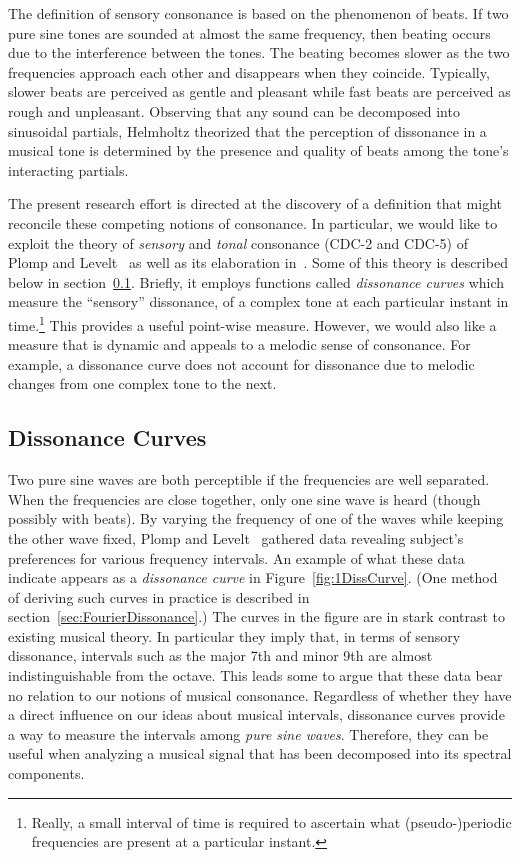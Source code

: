 The definition of sensory consonance is based on the  phenomenon of
beats.  If two pure sine tones are sounded at almost the same
frequency, then beating occurs due to the interference between the
tones.  The beating becomes slower as the two frequencies approach
each other and disappears when they coincide.  Typically, slower  
beats are perceived as gentle and pleasant while fast beats are
perceived as rough and unpleasant. Observing that any sound can be
decomposed into sinusoidal partials, Helmholtz \cite{Helmholtz:1877}
theorized that the perception of dissonance in a musical tone is
determined by the presence and quality of beats among the tone's
interacting partials. 

The present research effort is directed at the discovery of a
definition that might reconcile these competing notions of consonance.
In particular, we  would like to exploit the theory of \emph{sensory}
and \emph{tonal} consonance (CDC-2 and CDC-5)
of Plomp and Levelt~\cite{Plomp:1965} as well as its elaboration
in~\cite{Sethares:1997}.  Some of this theory is described below in
section~\ref{sec:disscurves}.  Briefly, it employs functions called
\emph{dissonance curves} which measure the ``sensory'' dissonance, of
a complex tone at each particular instant in time.\footnote{Really, a
small interval of time is required to ascertain what (pseudo-)periodic
frequencies are present at a particular instant.}   
This provides a useful point-wise measure.
However, we would also like a measure that is dynamic and appeals to a
melodic sense of consonance.  For example, a dissonance curve does not
account for dissonance due to melodic changes from one complex tone to
the next.  

\subsection{Dissonance Curves}
\label{sec:disscurves}
Two pure sine waves are both perceptible if the frequencies are well
separated.  When the frequencies are close together, only one sine
wave is heard (though possibly with beats).  By varying the frequency
of one of the waves while keeping the other wave fixed, Plomp and
Levelt~\cite{Plomp:1965} gathered data revealing subject's preferences
for various frequency intervals.  An example of what these data
indicate appears as a \emph{dissonance curve} in 
Figure~\ref{fig:1DissCurve}.  (One method of deriving such curves in
practice is described in section~\ref{sec:FourierDissonance}.)  The
curves in the figure are in stark contrast to existing musical theory.
In particular they imply that, in terms of sensory dissonance,
intervals such as the major 7th and minor 9th are almost
indistinguishable from the octave.  This leads some to argue that
these data bear no relation to our notions of musical
consonance. Regardless of whether they have a direct influence on our
ideas about musical intervals, dissonance curves provide a way to
measure the intervals among \emph{pure sine waves}.  Therefore, they
can be useful when analyzing a musical signal that has been decomposed
into its spectral components.


